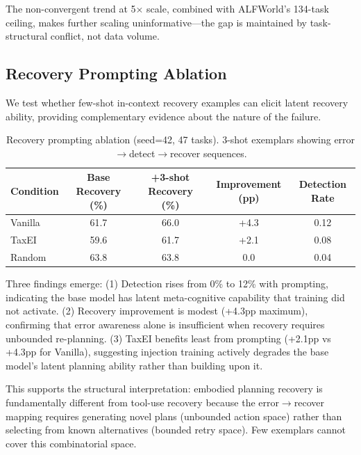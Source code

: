 \documentclass[11pt,a4paper]{article}
\begin{document}
The non-convergent trend at 5$\times$ scale, combined with ALFWorld's 134-task ceiling, makes further scaling uninformative---the gap is maintained by task-structural conflict, not data volume.

\subsection{Recovery Prompting Ablation}
\label{sec:prompting}

We test whether few-shot in-context recovery examples can elicit latent recovery ability, providing complementary evidence about the nature of the failure.

\begin{table}[h]
\centering
\caption{Recovery prompting ablation (seed=42, 47 tasks). 3-shot exemplars showing error$\rightarrow$detect$\rightarrow$recover sequences.}
\label{tab:prompting}
\begin{tabular}{lcccc}
\toprule
Condition & Base Recovery (\%) & +3-shot Recovery (\%) & Improvement (pp) & Detection Rate \\
\midrule
Vanilla & 61.7 & 66.0 & +4.3 & 0.12 \\
TaxEI & 59.6 & 61.7 & +2.1 & 0.08 \\
Random & 63.8 & 63.8 & 0.0 & 0.04 \\
\bottomrule
\end{tabular}
\end{table}

Three findings emerge: (1) Detection rises from 0\% to 12\% with prompting, indicating the base model has latent meta-cognitive capability that training did not activate. (2) Recovery improvement is modest (+4.3pp maximum), confirming that error awareness alone is insufficient when recovery requires unbounded re-planning. (3) TaxEI benefits least from prompting (+2.1pp vs +4.3pp for Vanilla), suggesting injection training actively degrades the base model's latent planning ability rather than building upon it.

This supports the structural interpretation: embodied planning recovery is fundamentally different from tool-use recovery because the error$\rightarrow$recover mapping requires generating novel plans (unbounded action space) rather than selecting from known alternatives (bounded retry space). Few exemplars cannot cover this combinatorial space.

\end{document}
